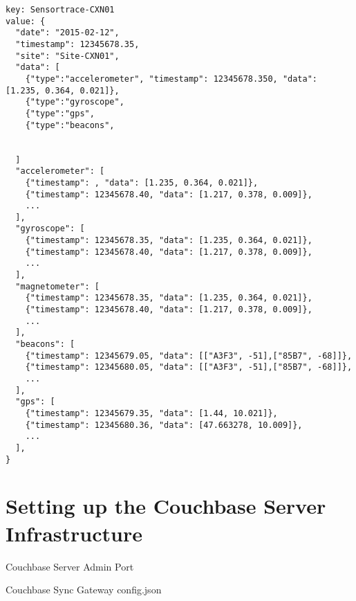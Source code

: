 \begin{lstlisting}[basicstyle=\footnotesize]
key: Sensortrace-CXN01
value: {
  "date": "2015-02-12",
  "timestamp": 12345678.35,
  "site": "Site-CXN01",
  "data": [
    {"type":"accelerometer", "timestamp": 12345678.350, "data": [1.235, 0.364, 0.021]},
    {"type":"gyroscope", 
    {"type":"gps", 
    {"type":"beacons", 
    
    
  ]
  "accelerometer": [
    {"timestamp": , "data": [1.235, 0.364, 0.021]},
    {"timestamp": 12345678.40, "data": [1.217, 0.378, 0.009]},
    ...
  ],
  "gyroscope": [
    {"timestamp": 12345678.35, "data": [1.235, 0.364, 0.021]},
    {"timestamp": 12345678.40, "data": [1.217, 0.378, 0.009]},
    ...
  ],
  "magnetometer": [
    {"timestamp": 12345678.35, "data": [1.235, 0.364, 0.021]},
    {"timestamp": 12345678.40, "data": [1.217, 0.378, 0.009]},
    ...
  ],
  "beacons": [
    {"timestamp": 12345679.05, "data": [["A3F3", -51],["85B7", -68]]},
    {"timestamp": 12345680.05, "data": [["A3F3", -51],["85B7", -68]]},
    ...
  ],
  "gps": [
    {"timestamp": 12345679.35, "data": [1.44, 10.021]},
    {"timestamp": 12345680.36, "data": [47.663278, 10.009]},
    ...
  ],
}
\end{lstlisting}


\section{Setting up the Couchbase Server Infrastructure}

Couchbase Server
Admin Port

Couchbase Sync Gateway
config.json

